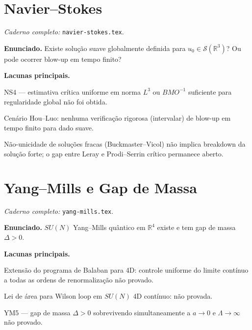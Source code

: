 \documentclass[11pt,a4paper]{article}
\begin{document}

\clearpage

\section{Navier–Stokes}

\textit{Caderno completo:} \texttt{navier-stokes.tex}.

\medskip
\noindent\textbf{Enunciado.}
Existe solução suave globalmente definida para $u_0\in\mathcal S(\mathbb R^3)$?
Ou pode ocorrer blow-up em tempo finito?

\medskip
\noindent\textbf{Lacunas principais.}
\begin{gap}
  NS4 — estimativa crítica uniforme em norma $L^3$ ou $BMO^{-1}$
  suficiente para regularidade global não foi obtida. \OPEN
\end{gap}
\begin{gap}
  Cenário Hou–Luo: nenhuma verificação rigorosa (intervalar) de blow-up
  em tempo finito para dado suave. \OPEN
\end{gap}
\begin{gap}
  Não-unicidade de soluções fracas (Buckmaster–Vicol) não implica
  breakdown da solução forte; o gap entre Leray e Prodi–Serrin
  crítico permanece aberto. \OPEN
\end{gap}


\clearpage

\section{Yang–Mills e Gap de Massa}

\textit{Caderno completo:} \texttt{yang-mills.tex}.

\medskip
\noindent\textbf{Enunciado.}
$SU(N)$ Yang–Mills quântico em $\mathbb R^4$ existe
e tem gap de massa $\Delta>0$.

\medskip
\noindent\textbf{Lacunas principais.}
\begin{gap}
  Extensão do programa de Balaban para 4D: controle uniforme do limite
  contínuo a todas as ordens de renormalização não provado. \OPEN
\end{gap}
\begin{gap}
  Lei de área para Wilson loop em $SU(N)$ 4D contínuo: não provada. \OPEN
\end{gap}
\begin{gap}
  YM5 — gap de massa $\Delta>0$ sobrevivendo simultaneamente a $a\to0$
  e $\Lambda\to\infty$ não provado. \OPEN
\end{gap}
\end{document}
